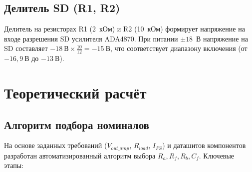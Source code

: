 \documentclass[a4paper, 12pt]{article}
\begin{document}
\subsection{Делитель SD (R1, R2)}

Делитель на резисторах R1 (2~кОм) и R2 (10~кОм) формирует
напряжение на входе разрешения SD усилителя ADA4870.
При питании $\pm 18$~В напряжение на SD составляет
\(-18\ \text{В} \times \frac{10}{12} = -15\ \text{В}\),
что соответствует диапазону включения (от \(-16{,}9\ \text{В}\)
до \(-13\ \text{В}\)).

\section{Теоретический расчёт}

\subsection{Алгоритм подбора номиналов}
\label{sec:algorithm}

На основе заданных требований (\(V_{out\_amp}\), \(R_{load}\), \(I_{FS}\)) и даташитов компонентов разработан автоматизированный алгоритм выбора \(R_a, R_f, R_b, C_f\). Ключевые этапы:
\end{document}
